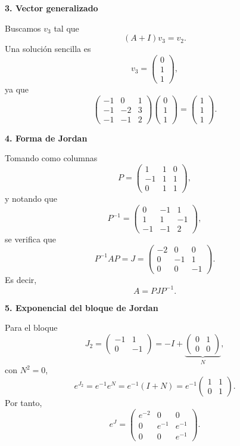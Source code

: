 \documentclass[11pt,spanish]{article}
\begin{document}
{\bf 3. Vector generalizado}

Buscamos $v_3$ tal que
$$
(A+I)v_3=v_2.
$$
Una solución sencilla es
$$
v_3=
\begin{pmatrix}
0\\
1\\
1
\end{pmatrix},
$$
ya que
$$
\begin{pmatrix}
-1&0&1\\
-1&-2&3\\
-1&-1&2
\end{pmatrix}
\begin{pmatrix}
0\\
1\\
1
\end{pmatrix}
=
\begin{pmatrix}
1\\
1\\
1
\end{pmatrix}.
$$

{\bf 4. Forma de Jordan}

Tomando como columnas
$$
P=
\begin{pmatrix}
1&1&0\\
-1&1&1\\
0&1&1
\end{pmatrix},
$$
y notando que
$$
P^{-1}=
\begin{pmatrix}
0&-1&1\\
1&1&-1\\
-1&-1&2
\end{pmatrix},
$$
se verifica que
$$
P^{-1}AP=
J=
\begin{pmatrix}
-2&0&0\\
0&-1&1\\
0&0&-1
\end{pmatrix}.
$$
Es decir,
$$
A=PJP^{-1}.
$$

{\bf 5. Exponencial del bloque de Jordan}

Para el bloque
$$
J_2=
\begin{pmatrix}
-1&1\\
0&-1
\end{pmatrix}
=
-I+
\underbrace{\begin{pmatrix}
0&1\\
0&0
\end{pmatrix}}_{N},
$$
con $N^2=0$,
$$
e^{J_2}
=
e^{-1}e^N
=
e^{-1}(I+N)
=
e^{-1}
\begin{pmatrix}
1&1\\
0&1
\end{pmatrix}.
$$
Por tanto,
$$
e^J=
\begin{pmatrix}
e^{-2}&0&0\\
0&e^{-1}&e^{-1}\\
0&0&e^{-1}
\end{pmatrix}.
$$
\end{document}
